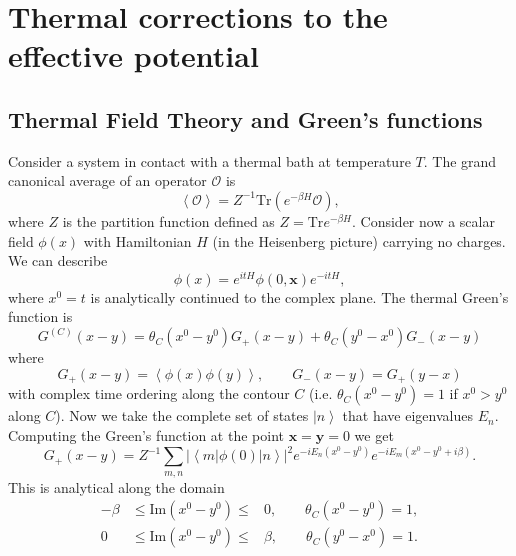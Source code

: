 \chapter{Thermal corrections to the effective potential}
\label{app:thermcorr}

\section{Thermal Field Theory and Green's functions}

Consider a system in contact with a thermal bath at temperature $T$. The grand canonical average of an operator $\mathcal{O}$ is
\begin{equation}
\left \langle \mathcal{O} \right \rangle = Z^{-1}\text{Tr}\left(e^{-\beta H} \mathcal{O} \right),
\end{equation}
where $Z$ is the partition function defined as $Z=\text{Tr}e^{-\beta H}$. Consider now a scalar field $\phi(x)$ with Hamiltonian $H$ (in the Heisenberg picture) carrying no charges. We can describe
\begin{equation}
\phi(x)= e^{it H} \phi(0,\textbf{x}) e^{-it H},
\end{equation}
where $x^0 = t$ is analytically continued to the complex plane. The thermal Green's function is 
\begin{equation}
G^{(C)}(x-y)=\theta_{C} (x^0 - y^0) G_{+} (x-y) + \theta_{C} (y^0 - x^0) G_{-} (x-y)
\label{eqn:greensscalar}
\end{equation}
where
\begin{equation}
G_{+}(x-y) = \left \langle \phi(x)\phi(y) \right \rangle, \qquad G_{-}(x-y)=G_{+}(y-x)
\end{equation}
with complex time ordering along the contour $C$ (i.e. $\theta_C (x^0-y^0)=1$ if $x^0 > y^0$ along $C$). Now we take the complete set of states $\left | n \right \rangle$ that have eigenvalues $E_n$. Computing the Green's function at the point $\textbf{x}=\textbf{y}=0$ we get
\begin{equation}
G_{+}(x-y) = Z^{-1} \sum_{m,n} |\left \langle m|\phi(0)|n \right \rangle|^2  e^{-iE_n(x^0 -y^0)}e^{-iE_m(x^0 -y^0+i\beta)}.
\end{equation}
This is analytical along the domain
\begin{eqnarray}
-\beta &\leq \text{Im}(x^0-y^0) \leq & 0, \qquad \theta_C (x^0-y^0)=1, \\
0 &\leq \text{Im}(x^0-y^0) \leq & \beta, \qquad \theta_C (y^0-x^0)=1.
\end{eqnarray}
